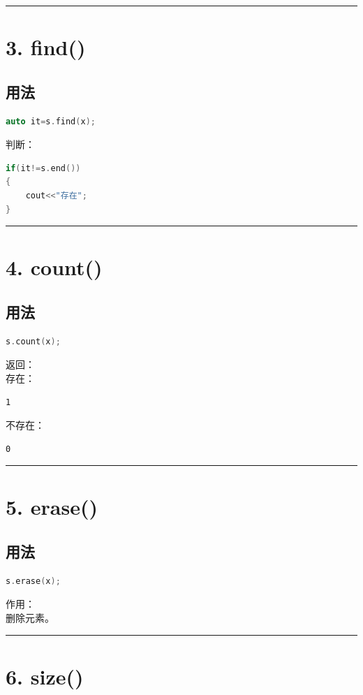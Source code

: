 \documentclass[9pt,twocolumn]{extarticle}
\begin{document}
\noindent\rule{\linewidth}{0.4pt}

\section{3. find()}

\subsection{用法}
\begin{lstlisting}[language=C++]
auto it=s.find(x);
\end{lstlisting}
判断：
\begin{lstlisting}[language=C++]
if(it!=s.end())
{
    cout<<"存在";
}
\end{lstlisting}

\noindent\rule{\linewidth}{0.4pt}

\section{4. count()}

\subsection{用法}
\begin{lstlisting}[language=C++]
s.count(x);
\end{lstlisting}
返回：\\
存在：
\begin{lstlisting}
1
\end{lstlisting}
不存在：
\begin{lstlisting}
0
\end{lstlisting}

\noindent\rule{\linewidth}{0.4pt}

\section{5. erase()}

\subsection{用法}
\begin{lstlisting}[language=C++]
s.erase(x);
\end{lstlisting}
作用：\\
删除元素。

\noindent\rule{\linewidth}{0.4pt}

\section{6. size()}
\end{document}
